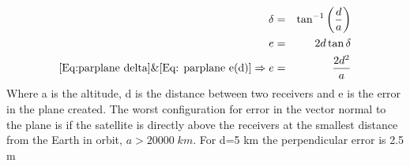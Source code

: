 \begin{eqnarray}
\delta &=& \tan^{-1}\left(\frac{d}{a}\right) \label{Eq:parplane delta}\\
e &=& 2d\tan\delta \label{Eq: parplane e(d)}\\
\eqref{Eq:parplane delta} \& \eqref{Eq: parplane e(d)}\Rightarrow e&=&\frac{2d^2}{a} \label{Eq:squarerel}
\end{eqnarray}
Where a is the altitude, d is the distance between two receivers and e is the error in the plane created. The worst configuration for error in the vector normal to the plane is if the satellite is directly above the receivers at the smallest distance from the Earth in orbit, $a>20000\;km$. For d=5 km the perpendicular error is 2.5 m




